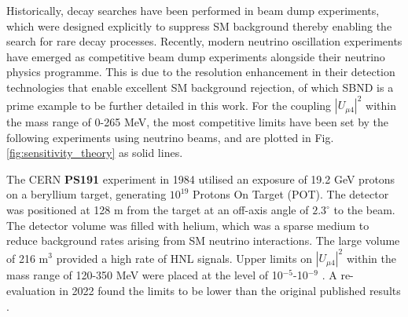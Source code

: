 Historically, decay searches have been performed in beam dump experiments, which were designed explicitly to suppress SM background thereby enabling the search for rare decay processes.
Recently, modern neutrino oscillation experiments have emerged as competitive beam dump experiments alongside their neutrino physics programme.
This is due to the resolution enhancement in their detection technologies that enable excellent SM background rejection, of which SBND is a prime example to be further detailed in this work. 
For the coupling $|U_{\mu4}|^{2}$ within the mass range of 0-265 MeV, the most competitive limits have been set by the following experiments using neutrino beams, and are plotted in Fig. \ref{fig:sensitivity_theory} as solid lines.

\begin{coloritemize}


\item The CERN \textbf{PS191} experiment in 1984 utilised an exposure of 19.2 GeV protons on a beryllium target, generating $10^{19}$ Protons On Target (POT).
The detector was positioned at 128 m from the target at an off-axis angle of $2.3^{\circ}$ to the beam.
The detector volume was filled with helium, which was a sparse medium to reduce background rates arising from SM neutrino interactions.
The large volume of 216 m$^3$ provided a high rate of HNL signals. 
Upper limits on $|U_{\mu4}|^{2}$ within the mass range of 120-350 MeV were placed at the level of 10$^{-5}$-10$^{-9}$ \cite{PS191A, PS191B}.
A re-evaluation in 2022 found the limits to be lower than the original published results \cite{PS191C}.
	


\end{coloritemize}
